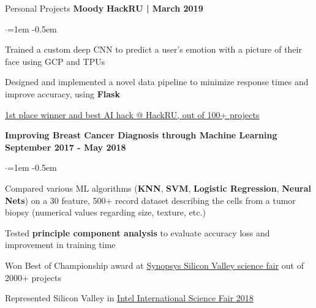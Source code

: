\documentclass[mm,centered]{resume} %
\begin{document}
\begin{rSection}{Personal Projects}
{\bf Moody}  \hfill {\bf HackRU | March 2019}
 \begin{list}{$\cdot$}{\leftmargin=1em} %
   \itemsep -0.5em \vspace{-0.5em} %
	\item 
		Trained a custom deep CNN to predict a user’s emotion with a picture of their face using GCP and TPUs
	\item 
		Designed and implemented a novel data pipeline to minimize response times and improve accuracy, using \textbf{Flask}
	\item
		\underline{1st place winner and best AI hack @ HackRU, out of 100+ projects}
  \end{list}

{\bf Improving Breast Cancer Diagnosis through Machine Learning} \hfill {\bf September 2017 - May 2018}
 \begin{list}{$\cdot$}{\leftmargin=1em} %
   \itemsep -0.5em \vspace{-0.5em} %
	\item 
		Compared various ML algorithms (\textbf{KNN}, \textbf{SVM}, \textbf{Logistic Regression}, \textbf{Neural Nets}) on a 30 feature, 500+ record dataset describing the cells from a tumor biopsy (numerical values regarding size, texture, etc.)
	\item
		Tested \textbf{principle component analysis} to evaluate accuracy loss and improvement in training time
	\item
		Won Best of Championship award at \underline{Synopsys Silicon Valley science fair} out of 2000+ projects
	\item
		Represented Silicon Valley in \underline{Intel International Science Fair 2018}
  \end{list}


\end{rSection}
\end{document}
